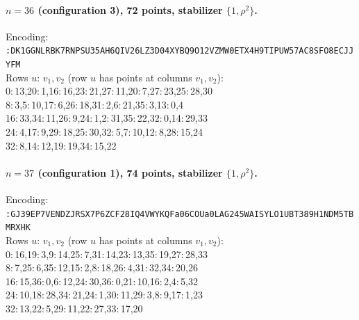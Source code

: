 \paragraph{$n=36$ (configuration 3), 72 points, stabilizer $\{1,\rho^2\}$.} Encoding:\\
{\small \texttt{:DK1GGNLRBK7RNPSU35AH6QIV26LZ3\allowbreak D04XYBQ9O12VZMW0ETX4H9TIPUW57A\allowbreak C8SFO8ECJJYFM}}\\
Rows $u:\,v_1,v_2$ (row $u$ has points at columns $v_1,v_2$):\\
{\small
  0:\,13,20:\,1,16:\,16,23:\,21,27:\,11,20:\,7,27:\,23,25:\,28,30 \\
  8:\,3,5:\,10,17:\,6,26:\,18,31:\,2,6:\,21,35:\,3,13:\,0,4 \\
  16:\,33,34:\,11,26:\,9,24:\,1,2:\,31,35:\,22,32:\,0,14:\,29,33 \\
  24:\,4,17:\,9,29:\,18,25:\,30,32:\,5,7:\,10,12:\,8,28:\,15,24 \\
  32:\,8,14:\,12,19:\,19,34:\,15,22
}

\paragraph{$n=37$ (configuration 1), 74 points, stabilizer $\{1,\rho^2\}$.} Encoding:\\
{\small \texttt{:GJ39EP7VENDZJRSX7P6ZCF28IQ4VW\allowbreak YKQFa06COUa0LAG245WAISYLO1UBT3\allowbreak 89H1NDM5TBMRXHK}}\\
Rows $u:\,v_1,v_2$ (row $u$ has points at columns $v_1,v_2$):\\
{\small
  0:\,16,19:\,3,9:\,14,25:\,7,31:\,14,23:\,13,35:\,19,27:\,28,33 \\
  8:\,7,25:\,6,35:\,12,15:\,2,8:\,18,26:\,4,31:\,32,34:\,20,26 \\
  16:\,15,36:\,0,6:\,12,24:\,30,36:\,0,21:\,10,16:\,2,4:\,5,32 \\
  24:\,10,18:\,28,34:\,21,24:\,1,30:\,11,29:\,3,8:\,9,17:\,1,23 \\
  32:\,13,22:\,5,29:\,11,22:\,27,33:\,17,20
}

